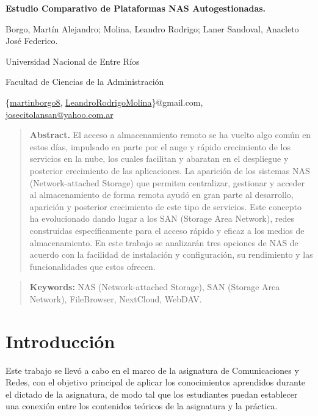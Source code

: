 \documentclass[a4paper,10pt]{article}
\begin{document}
	\centering
	{\fontsize{14}{17}\bfseries Estudio Comparativo de Plataformas NAS Autogestionadas.\par}
	{\small Borgo, Martín Alejandro; Molina, Leandro Rodrigo; Laner Sandoval, Anacleto José Federico.\par}
	{\normalsize Universidad Nacional de Entre Ríos\par}
	{\normalsize Facultad de Ciencias de la Administración\par}
	{\small
		\{\href{mailto:martinborgo8@gmail.com}{martinborgo8},
		\href{mailto:LeandroRodrigoMolina@gmail.com}{LeandroRodrigoMolina}\}@gmail.com,
		\href{mailto:josecitolansan@yahoo.com.ar}{josecitolansan@yahoo.com.ar}
		\par}	
	{\begin{quote} \small \justify\textbf{Abstract.} El acceso a almacenamiento remoto se ha vuelto algo común en estos días, impulsado en parte por el auge y rápido crecimiento de los servicios en la nube, los cuales facilitan y abaratan en el despliegue y posterior crecimiento de las aplicaciones. La aparición de los sistemas NAS (Network-attached Storage) que permiten centralizar, gestionar y acceder al almacenamiento de forma remota ayudó en gran parte al desarrollo, aparición y posterior crecimiento de este tipo de servicios. Este concepto ha evolucionado dando lugar a los SAN (Storage Area Network), redes construidas específicamente para el acceso rápido y eficaz a los medios de almacenamiento. En este trabajo se analizarán tres opciones de NAS de acuerdo con la facilidad de instalación y configuración, su rendimiento y las funcionalidades que estos ofrecen. \end{quote} \par}
	{\begin{quote} \small \justify\textbf{Keywords:} NAS (Network-attached Storage), SAN (Storage Area Network), FileBrowser, NextCloud, WebDAV.\end{quote} \par}
	
	\justifying
	
	\section{Introducción}
	Este trabajo se llevó a cabo en el marco de la asignatura de Comunicaciones y Redes, con el objetivo principal de aplicar los conocimientos aprendidos durante el dictado de la asignatura, de modo tal que los estudiantes puedan establecer una conexión entre los contenidos teóricos de la asignatura y la práctica.
	
\end{document}

